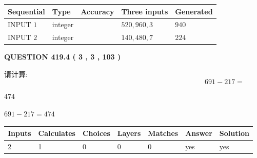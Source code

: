 \documentclass{ctexart}
\begin{document}
   
  
  
\noindent\begin{tabular}{|l|l|l|l|l|}
\hline
 Sequential & Type & Accuracy & Three inputs & Generated \\ 
\hline
 
 
  INPUT $  1 $ & integer &  & $
 520
 , 
 960
 , 
 3
 $ & $ 940 $ 
 \\  \hline  
 
 
  INPUT $  2 $ & integer &  & $
 140
 , 
 480
 , 
 7
 $ & $ 224 $ 
 \\  \hline  
 \end{tabular}
   
   
  
\vspace{0.2in}
  
{\textbf{\Large{QUESTION
419.4 
 ( 3 , 3 , 103 )
}}}
  
  
 
请计算:
\begin{equation}
691 -   %
217 = \nonumber
\end{equation}
 
 
 
\noindent{}
 
 

474
 
 
\noindent{}
 
 

 
 
 
\noindent{}
 
 

$ %
691 -  %
217=   %
474$
 
 
\noindent{}
 
 

 
   
   
   
   
\noindent\begin{tabular}{|l|l|l|l|l|l|l|}
 \hline
Inputs & Calculates & Choices & Layers & Matches & Answer & Solution \\ \hline
 2  & 
 1  & 
 0
  & 
 0  & 
 0  & 
  yes & 
  yes 
  \\ \hline
 \end{tabular}
   
\end{document}
